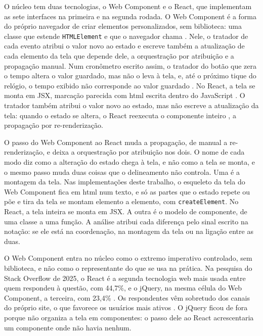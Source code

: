 O núcleo tem duas tecnologias, o Web Component e o React, que
implementam as sete interfaces na primeira e na segunda rodada.
O Web Component é a forma do próprio navegador de criar elementos
personalizados, sem biblioteca: uma classe que estende \texttt{HTMLElement} e
que o navegador chama \cite{mozilla2026}.
Nele, o tratador de cada evento atribui o valor novo ao estado e escreve
também a atualização de cada elemento da tela que depende dele, a
orquestração por atribuição e a propagação manual.
Num cronômetro escrito assim, o tratador do botão que zera o tempo
altera o valor guardado, mas não o leva à tela, e, até o próximo tique
do relógio, o tempo exibido não corresponde ao valor guardado
\cite[p. 3]{meyerovich2009}.
No React, a tela se monta em JSX, marcação parecida com \gls{html}
escrita dentro do JavaScript \cite{meta2026c}.
O tratador também atribui o valor novo ao estado, mas não escreve a
atualização da tela: quando o estado se altera, o React reexecuta o
componente inteiro \cites[][ p. 289:38]{lee2025}{solidjs2026}, a
propagação por re-renderização.

O passo do Web Component ao React muda a propagação, de manual a
re-renderização, e deixa a orquestração por atribuição nos dois.
O nome de cada modo diz como a alteração do estado chega à tela, e não
como a tela se monta, e o mesmo passo muda duas coisas que o
delineamento não controla.
Uma é a montagem da tela.
Nas implementações deste trabalho, o esqueleto da tela do Web Component
fica em \gls{html} num texto, e só as partes que o estado repete ou põe
e tira da tela se montam elemento a elemento, com \texttt{createElement}.
No React, a tela inteira se monta em JSX.
A outra é o modelo de componente, de uma classe a uma função.
A análise atribui cada diferença pelo sinal escrito na notação: se ele
está na coordenação, na montagem da tela ou na ligação entre as duas.

O Web Component entra no núcleo como o extremo imperativo controlado,
sem biblioteca, e não como o representante do que se usa na prática.
Na pesquisa do Stack Overflow de 2025, o React é a segunda tecnologia
web mais usada entre quem respondeu à questão, com 44,7\%, e o jQuery,
na mesma célula do Web Component, a terceira, com 23,4\%
\cite{stackoverflow2025}.
Os respondentes vêm sobretudo dos canais do próprio site, o que favorece
os usuários mais ativos \cite{stackoverflow2025}.
O jQuery ficou de fora porque não organiza a tela em componentes: o
passo dele ao React acrescentaria um componente onde não havia nenhum.

